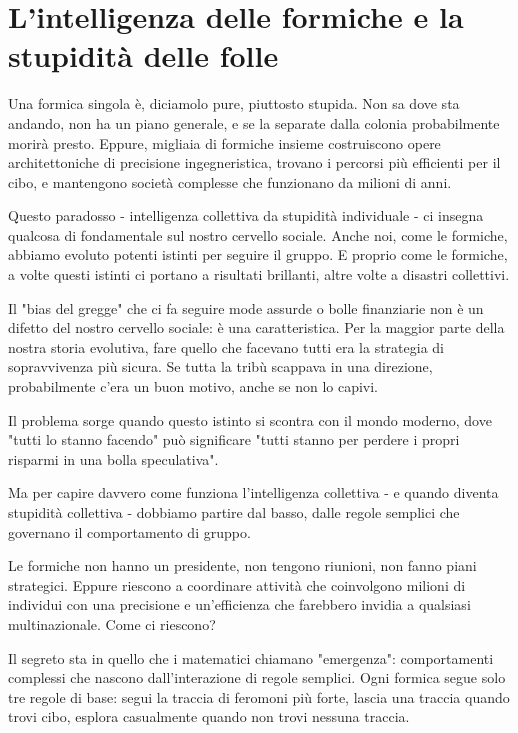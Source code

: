 \chapter{L'intelligenza delle formiche e la stupidità delle folle}

Una formica singola è, diciamolo pure, piuttosto stupida. Non sa dove sta andando, non ha un piano generale, e se la separate dalla colonia probabilmente morirà presto. Eppure, migliaia di formiche insieme costruiscono opere architettoniche di precisione ingegneristica, trovano i percorsi più efficienti per il cibo, e mantengono società complesse che funzionano da milioni di anni.

Questo paradosso - intelligenza collettiva da stupidità individuale - ci insegna qualcosa di fondamentale sul nostro cervello sociale. Anche noi, come le formiche, abbiamo evoluto potenti istinti per seguire il gruppo. E proprio come le formiche, a volte questi istinti ci portano a risultati brillanti, altre volte a disastri collettivi.

Il "bias del gregge" che ci fa seguire mode assurde o bolle finanziarie non è un difetto del nostro cervello sociale: è una caratteristica. Per la maggior parte della nostra storia evolutiva, fare quello che facevano tutti era la strategia di sopravvivenza più sicura. Se tutta la tribù scappava in una direzione, probabilmente c'era un buon motivo, anche se non lo capivi.

Il problema sorge quando questo istinto si scontra con il mondo moderno, dove "tutti lo stanno facendo" può significare "tutti stanno per perdere i propri risparmi in una bolla speculativa".

\bigskip

Ma per capire davvero come funziona l'intelligenza collettiva - e quando diventa stupidità collettiva - dobbiamo partire dal basso, dalle regole semplici che governano il comportamento di gruppo.

Le formiche non hanno un presidente, non tengono riunioni, non fanno piani strategici. Eppure riescono a coordinare attività che coinvolgono milioni di individui con una precisione e un'efficienza che farebbero invidia a qualsiasi multinazionale. Come ci riescono?

Il segreto sta in quello che i matematici chiamano "emergenza": comportamenti complessi che nascono dall'interazione di regole semplici. Ogni formica segue solo tre regole di base: segui la traccia di feromoni più forte, lascia una traccia quando trovi cibo, esplora casualmente quando non trovi nessuna traccia.

